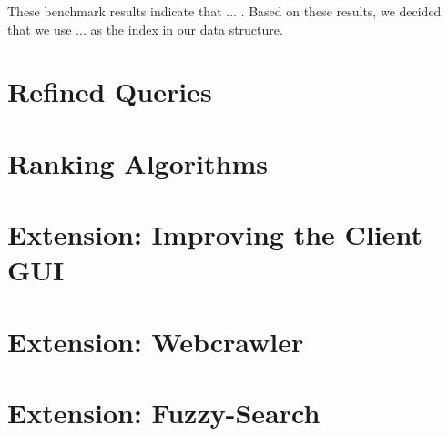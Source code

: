 \documentclass[11pt]{article}
\begin{document}
%
These benchmark results indicate that ... .
%
Based on these results, we decided that we use ... as the index in our
data structure.

\section{Refined Queries}

\section{Ranking Algorithms}

\section{Extension: Improving the Client GUI}
\section{Extension: Webcrawler}
\section{Extension: Fuzzy-Search}
\end{document}
